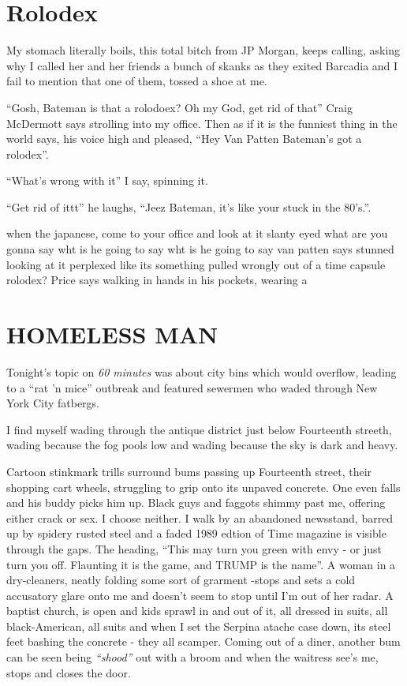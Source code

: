 \documentclass[19pt,openany]{book}
\begin{document}
\chapter{Rolodex}
My stomach literally boils, this total bitch
from JP Morgan, keeps calling, asking why I called her and her friends a bunch of skanks as they exited Barcadia and I fail to mention
that one of them, tossed a shoe at me.

``Gosh, Bateman is that a rolodoex? Oh my
God, get rid of that'' Craig McDermott says strolling into
my office. Then as if it is the funniest thing in the world says,
his voice high and pleased, ``Hey Van Patten Bateman's got a rolodex''.

``What's wrong with it'' I say, spinning it.

``Get rid of ittt'' he laughs, ``Jeez Bateman, it's like your stuck in the 80's.''.

when the japanese, come to your office and look at it slanty eyed what are you gonna say
wht is he going to say
wht is he going to say
van patten says stunned looking at it perplexed like its something pulled wrongly out of a time capsule
rolodex? Price says walking in hands in his pockets, wearing a
\chapter{HOMELESS MAN}
Tonight's topic on \textit{60 minutes} was about
city bins which would overflow, leading to a ``rat 'n mice''
outbreak and featured sewermen who waded through New York City fatbergs.

I find myself wading through the antique district just below Fourteenth streeth,
wading because the fog pools low and wading because the sky is dark and heavy.

Cartoon stinkmark trills surround bums passing up Fourteenth street,
their shopping cart wheels, struggling to grip onto its unpaved concrete.
One even falls and his buddy picks him up.
Black guys and faggots shimmy
past me, offering either crack or sex. I choose neither. I walk by an
abandoned newsstand, barred up by spidery rusted steel and
a faded 1989 edtion of Time magazine is visible through
the gaps. The heading, ``This may turn you green with envy -
or just turn you off. Flaunting it is the game, and TRUMP is
the name''.
A woman in a dry-cleaners, neatly folding some sort
of grarment -stops and sets a cold accusatory glare onto me
and doesn't seem to stop until I'm out of her radar. A baptist church, is
open and kids sprawl in and out of it, all dressed in suits,
all black-American, all suits and when I set the Serpina atache case down, its
steel feet bashing the concrete - they all scamper.
Coming out of a diner, another bum can be seen being
\textit{``shood''} out with a broom and when the waitress
see's me, stops and closes the door.
\end{document}
